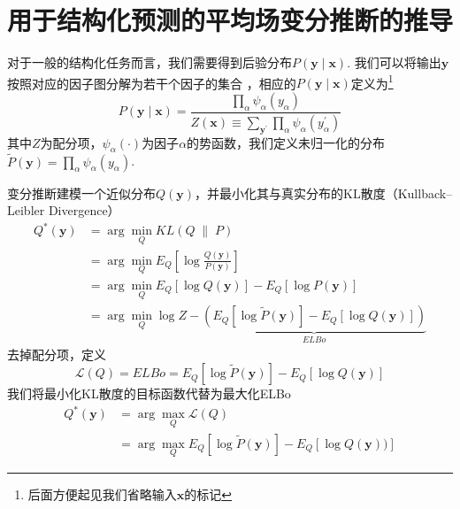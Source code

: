 \chapter{用于结构化预测的平均场变分推断的推导}
\label{appendix:mfvi-derivation}
对于一般的结构化任务而言，我们需要得到后验分布$P(\boldsymbol{y}\mid\boldsymbol{x})$.
我们可以将输出$\boldsymbol{y}$按照对应的因子图分解为若干个因子的集合 \citep{sutton-etal-2012-crf}，相应的$P(\boldsymbol{y}\mid\boldsymbol{x})$定义为\footnote{后面方便起见我们省略输入$\boldsymbol{x}$的标记}
\begin{equation}\label{eq:posterior}
	P(\boldsymbol{y}\mid\boldsymbol{x}) =\frac{\prod_{\alpha} \psi_{\alpha}(y_{\alpha})}{Z(\boldsymbol{x})\equiv\sum_{\boldsymbol{y}^{\prime}}\prod_{\alpha} \psi_{\alpha}(y^{\prime}_{\alpha})}
\end{equation}
其中$Z$为配分项，$\psi_{\alpha}(\cdot)$为因子$\alpha$的势函数，我们定义未归一化的分布$\tilde{P}(\boldsymbol{y})=\prod_{\alpha} \psi_{\alpha}(y_{\alpha})$.

变分推断建模一个近似分布$Q(\boldsymbol{y})$，并最小化其与真实分布的KL散度（Kullback–Leibler Divergence）
\begin{equation}
	\begin{split}
		Q^{\ast}(\boldsymbol{y})
		&=\arg\min_{Q} KL(Q\;\|\;P)\\
		&=\arg\min_{Q} E_{Q}\left[\log\frac{Q(\boldsymbol{y})}{P(\boldsymbol{y})}\right]\\
		&=\arg\min_{Q} E_{Q}\left[\log Q(\boldsymbol{y})\right] - E_{Q}\left[\log P(\boldsymbol{y})\right]\\
		&=\arg\min_{Q} \log Z-\underbrace{\left(E_{Q}\left[\log \tilde{P}(\boldsymbol{y})\right]-E_{Q}\left[\log Q(\boldsymbol{y})\right]\right)}_{ELBo}
	\end{split}
\end{equation}
去掉配分项，定义
\begin{equation}
	\mathcal{L}(Q)=ELBo=E_{Q}\left[\log \tilde{P}(\boldsymbol{y})\right]-E_{Q}\left[\log Q(\boldsymbol{y})\right]
\end{equation}
我们将最小化KL散度的目标函数代替为最大化ELBo
\begin{equation}
	\begin{split}
		Q^{\ast}(\boldsymbol{y}) &= \arg\max_{Q}\mathcal{L}(Q)\\
		&= \arg\max_{Q}E_{Q}\left[\log \tilde{P}(\boldsymbol{y})\right]-E_{Q}\left[\log Q(\boldsymbol{y}))\right]
	\end{split}
\end{equation}


